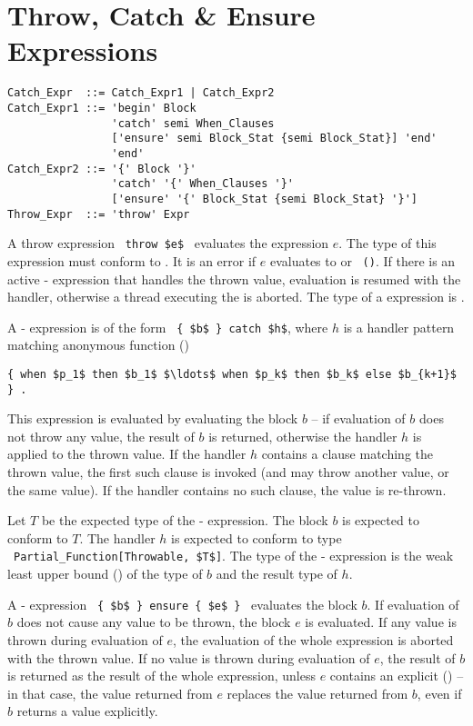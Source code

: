 \section{Throw, Catch \& Ensure Expressions}
\label{sec:throw-catch-expressions}

\syntax\begin{lstlisting}
Catch_Expr  ::= Catch_Expr1 | Catch_Expr2
Catch_Expr1 ::= 'begin' Block 
                'catch' semi When_Clauses
                ['ensure' semi Block_Stat {semi Block_Stat}] 'end'
                'end'
Catch_Expr2 ::= '{' Block '}'
                'catch' '{' When_Clauses '}'
                ['ensure' '{' Block_Stat {semi Block_Stat} '}']
Throw_Expr  ::= 'throw' Expr
\end{lstlisting}

A throw expression ~\lstinline!throw $e$!~ evaluates the expression $e$. The type of this expression must conform to . It is an error if $e$ evaluates to  or ~\lstinline!()!. If there is an active - expression that handles the thrown value, evaluation is resumed with the handler, otherwise a thread executing the  is aborted. The type of a  expression is . 

A - expression is of the form ~\lstinline!{ $b$ } catch $h$!, where $h$ is a handler pattern matching anonymous function ()
\begin{lstlisting}
{ when $p_1$ then $b_1$ $\ldots$ when $p_k$ then $b_k$ else $b_{k+1}$ } .
\end{lstlisting}

This expression is evaluated by evaluating the block $b$ -- if evaluation of $b$ does not throw any value, the result of $b$ is returned, otherwise the handler $h$ is applied to the thrown value. If the handler $h$ contains a  clause matching the thrown value, the first such clause is invoked (and may throw another value, or the same value). If the handler contains no such clause, the value is re-thrown. 

Let $T$ be the expected type of the - expression. The block $b$ is expected to conform to $T$. The handler $h$ is expected to conform to type ~\lstinline!Partial_Function[Throwable, $T$]!. The type of the - expression is the weak least upper bound () of the type of $b$ and the result type of $h$. 

A - expression ~\lstinline!{ $b$ } ensure { $e$ }!~ evaluates the block $b$. If evaluation of $b$ does not cause any value to be thrown, the block $e$ is evaluated. If any value is thrown during evaluation of $e$, the evaluation of the whole expression is aborted with the thrown value. If no value is thrown during evaluation of $e$, the result of $b$ is returned as the result of the whole expression, unless $e$ contains an explicit  () -- in that case, the value returned from $e$ replaces the value returned from $b$, even if $b$ returns a value explicitly. 

